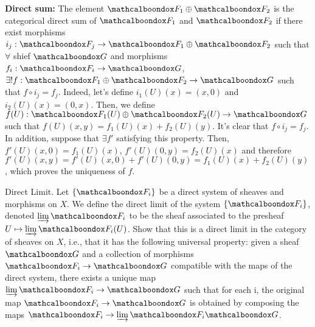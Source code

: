 \begin{sol}
	\textbf{Direct sum:} The element $\sF_1 \oplus \sF_2$ is the categorical direct sum of $\sF_1$ and $\sF_2$ if there exist morphisms $i_j: \sF_j \to  \sF_1 \oplus \sF_2$ such that $\forall$ shief $\sG$ and morphisms $f_i : \sF_i \to \sG$, $\exists ! f: \sF_1 \oplus \sF_2 \to \sG$ such that $f \circ i_j = f_j$. Indeed, let's define $i_1(U)(x) = (x,0)$ and $i_2(U)(x) = (0,x)$. Then, we define $f(U): \sF_1(U) \oplus \sF_2(U) \to \sG$ such that $f(U)(x,y) = f_1(U)(x) + f_2(U)(y)$. It's clear that $f \circ i_j = f_j$. In addition, suppose that $\exists f'$ satisfying this property. Then, $f'(U)(x,0) = f_1(U)(x)$, $f'(U)(0,y) = f_2(U)(x)$ and therefore $f'(U)(x,y) = f'(U)(x,0) + f'(U)(0,y) = f_1(U)(x) + f_2(U)(y)$, which proves the uniqueness of $f$.
\end{sol}

\begin{ex}
	Direct Limit. Let $\{\sF_i\}$ be a direct system of sheaves and morphisms on $X$. We define the direct limit of the system $\{\sF_i\}$, denoted $\varinjlim \sF_i$ to be the sheaf associated to the presheaf $U \mapsto \varinjlim \sF_i(U)$. Show that this is a direct limit in the category of sheaves on $X$, i.e., that it has the following universal property: given a sheaf $\sG$ and a collection of morphisms $\sF_i \to \sG$ compatible with the maps of the direct system, there exists a unique map $\varinjlim \sF_i \to \sG$ such that for each i, the original map $\sF_i \to \sG$ is obtained by composing the maps $\sF_i \to \varinjlim \sF_i \sG$.
\end{ex}

